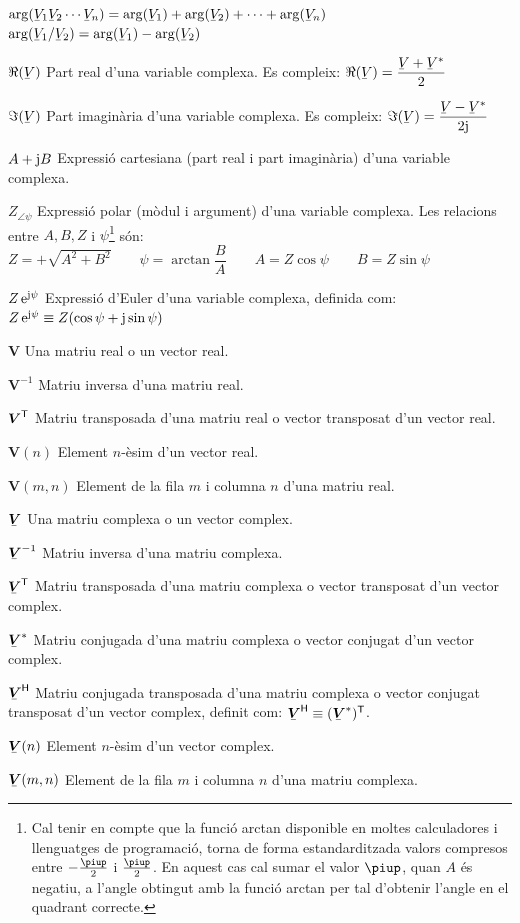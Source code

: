 \begin{list}{}
      $\arg(\cmplx{V}_1 \cmplx{V}_2 \cdots \cmplx{V}_n) = \arg(\cmplx{V}_1) + \arg (\cmplx{V}_2) + \cdots + \arg(\cmplx{V}_n)$\\[1ex]
      $\arg(\cmplx{V}_1 / \cmplx{V}_2) = \arg(\cmplx{V}_1) - \arg (\cmplx{V}_2)$
    \item[$\Re(\cmplx{V})$] Part real d'una variable complexa. Es compleix: $\Re(\cmplx{V}) = \dfrac{\cmplx{V} + \cmplx{V}^*}{2}$
    \item[$\Im(\cmplx{V})$] Part imagin\`{a}ria d'una variable complexa. Es compleix: $\Im(\cmplx{V}) = \dfrac{\cmplx{V} - \cmplx{V}^*}{2 \ju}$
    \item[$A+\mathrm{j} B$] Expressi\'{o} cartesiana (part real i part
    imagin\`{a}ria) d'una variable complexa.
    \item[$Z_{\angle \psi}$] Expressi\'{o} polar (m\`{o}dul i argument) d'una variable
    complexa. Les relacions entre $A, B, Z$ i $\psi$\footnote{Cal tenir en compte que la funci\'{o} \textsf{arctan} disponible en moltes calculadores i llenguatges de programaci\'{o}, torna de forma  estandarditzada valors compresos entre $-\frac{\piup}{2}$ i $\frac{\piup}{2}$. En aquest cas cal sumar el valor $\piup$, quan $A$ \'{e}s negatiu, a l'angle obtingut amb la funci\'{o} \textsf{arctan} per tal d'obtenir l'angle en el quadrant correcte.} s\'{o}n:\\[1ex]
    $Z=+\sqrt{A^2+B^2}\quad\quad\psi=\arctan{\dfrac{B}{A}}\quad\quad
    A=Z\cos\psi\quad\quad B=Z\sin\psi$
    \item[$Z\,\mathrm{e}^{\mathrm{j}\psi}$] Expressi\'{o} d'Euler d'una variable complexa, definida com:
     $Z\,\mathrm{e}^{\mathrm{j}\psi} \equiv Z(\cos\psi+\mathrm{j}\sin\psi)$
    \item[$\boldsymbol{V}$] Una matriu real o un vector real.
    \item[$\boldsymbol{V}^{-1}$] Matriu inversa d'una matriu real.
    \item[$\boldsymbol{V}^\mathrm{\textsf{T}}$] Matriu transposada d'una matriu real o vector
    transposat d'un vector real.
    \item[$\boldsymbol{V}(n)$] Element $n$-\`{e}sim d'un vector real.
    \item[$\boldsymbol{V}(m,n)$] Element de la fila $m$ i columna $n$ d'una matriu real.
    \item[$\mcmplx{V}$] Una matriu complexa o un vector complex.
    \item[$\mcmplx{V}^{-1}$] Matriu inversa d'una matriu complexa.
    \item[$\transp{\mcmplx{V}}$] Matriu transposada d'una matriu complexa o vector
    transposat d'un vector complex.
    \item[$\mcmplx{V}^*$] Matriu conjugada d'una matriu complexa o vector
    conjugat d'un vector complex.
    \item[$\hermit{V}$] Matriu conjugada transposada d'una matriu complexa o vector
    conjugat transposat d'un vector complex, definit com: $\hermit{V} \equiv
    \transp{(\mcmplx{V}^*)}$.
    \item[$\mcmplx{V}(n)$] Element $n$-\`{e}sim d'un vector complex.
    \item[$\mcmplx{V}(m,n)$] Element de la fila $m$ i columna $n$ d'una matriu complexa.
\end{list}

